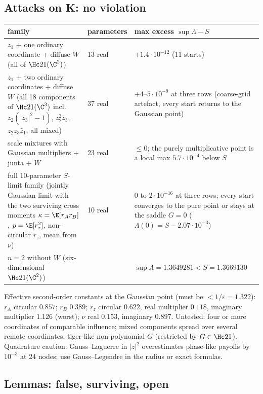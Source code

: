 \subsection{Attacks on K: no violation}\label{sec:Kattack}
\begin{center}\small
\begin{tabular}{p{7.4cm}p{2.1cm}p{4.9cm}}\toprule
family & parameters & max excess $\sup\Lambda-S$\\\midrule
$z_1$ + one ordinary coordinate + diffuse $W$ (all of $\Hc21(\C^2)$) & 13 real & $+1.4\cdot10^{-12}$ (11 starts)\\
$z_1$ + two ordinary coordinates + diffuse $W$ (all 18 components of $\Hc21(\C^3)$ incl.\ $z_2(|z_3|^2-1)$, $z_2^2\bar z_3$, $z_2z_3\bar z_1$, all mixed) & 37 real & $+4$--$5\cdot10^{-9}$ at three rows (coarse-grid artefact, every start returns to the Gaussian point)\\
scale mixtures with Gaussian multipliers + junta + $W$ & 23 real & $\le0$; the purely multiplicative point is a local max $5.7\cdot10^{-4}$ below $S$\\
full 10-parameter $S$-limit family (jointly Gaussian limit with the two surviving cross moments $\kappa=\E[r_Ar_B]$, $p=\E[r_z^2]$, non-circular $r_z$, mean from $\nu$) & 10 real & $0$ to $2\cdot10^{-16}$ at three rows; every start converges to the pure point or stays at the saddle $G=0$ ($\Lambda(0)=S-2.07\cdot10^{-3}$)\\
$n=2$ without $W$ (six-dimensional $\Hc21(\C^2)$) & & $\sup\Lambda=1.3649281<S=1.3669130$\\\bottomrule
\end{tabular}
\end{center}
Effective second-order constants at the Gaussian point (must be $<1/\varepsilon=1.322$): $r_A$ circular $0.857$; $r_B$ $0.389$; $r_z$ circular $0.622$, real multiplier
$0.118$, imaginary multiplier $1.126$ (worst); $\nu$ real $0.153$, imaginary $0.897$. Untested: four or more coordinates of comparable influence; mixed components
spread over several remote coordinates; tiger-like non-polynomial $G$ (restricted by $G\in\Hc21$). Quadrature caution: Gauss--Laguerre in $|z|^2$ overestimates
phase-like payoffs by $10^{-3}$ at 24 nodes; use Gauss--Legendre in the radius or exact formulas.

\subsection{Lemmas: false, surviving, open}\label{sec:lemmas}

